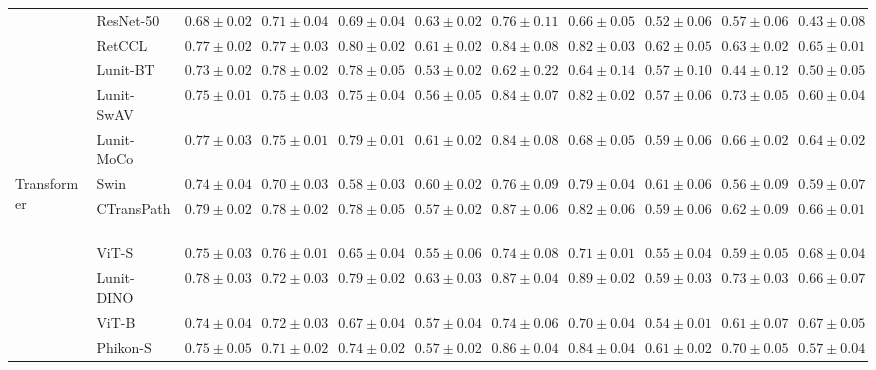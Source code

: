 \begin{tabular}{ll|cccc|c|cccc}
 & ResNet-50~\cite{he2015deep} & $0.68 \pm 0.02$ & $0.71 \pm 0.04$ & $0.69 \pm 0.04$ & $0.63 \pm 0.02$ & $0.76 \pm 0.11$ & $0.66 \pm 0.05$ & $0.52 \pm 0.06$ & $0.57 \pm 0.06$ & $0.43 \pm 0.08$ \\
 & RetCCL~\cite{wang2023retccl} & $0.77 \pm 0.02$ & $0.77 \pm 0.03$ & $0.80 \pm 0.02$ & $0.61 \pm 0.02$ & $0.84 \pm 0.08$ & $0.82 \pm 0.03$ & $\mathbf{0.62 \pm 0.05}$ & $0.63 \pm 0.02$ & $0.65 \pm 0.01$ \\
 & Lunit-BT~\cite{kang2023benchmarking} & $0.73 \pm 0.02$ & $0.78 \pm 0.02$ & $0.78 \pm 0.05$ & $0.53 \pm 0.02$ & $0.62 \pm 0.22$ & $0.64 \pm 0.14$ & $0.57 \pm 0.10$ & $0.44 \pm 0.12$ & $0.50 \pm 0.05$ \\
 & Lunit-SwAV~\cite{kang2023benchmarking} & $0.75 \pm 0.01$ & $0.75 \pm 0.03$ & $0.75 \pm 0.04$ & $0.56 \pm 0.05$ & $0.84 \pm 0.07$ & $0.82 \pm 0.02$ & $0.57 \pm 0.06$ & $0.73 \pm 0.05$ & $0.60 \pm 0.04$ \\
 & Lunit-MoCo~\cite{kang2023benchmarking} & $0.77 \pm 0.03$ & $0.75 \pm 0.01$ & $0.79 \pm 0.01$ & $0.61 \pm 0.02$ & $0.84 \pm 0.08$ & $0.68 \pm 0.05$ & $0.59 \pm 0.06$ & $0.66 \pm 0.02$ & $0.64 \pm 0.02$ \\
\cline{1-11}
\multirow[t]{14}{*}{Transformer} & Swin~\cite{liu2021swin} & $0.74 \pm 0.04$ & $0.70 \pm 0.03$ & $0.58 \pm 0.03$ & $0.60 \pm 0.02$ & $0.76 \pm 0.09$ & $0.79 \pm 0.04$ & $0.61 \pm 0.06$ & $0.56 \pm 0.09$ & $0.59 \pm 0.07$ \\
 & CTransPath~\cite{wang2022transformer} & $0.79 \pm 0.02$ & $\mathbf{0.78 \pm 0.02}$ & $0.78 \pm 0.05$ & $0.57 \pm 0.02$ & $0.87 \pm 0.06$ & $0.82 \pm 0.06$ & $0.59 \pm 0.06$ & $0.62 \pm 0.09$ & $0.66 \pm 0.01$ \\
 & ViT-S~\cite{kolesnikov2021image} & $0.75 \pm 0.03$ & $0.76 \pm 0.01$ & $0.65 \pm 0.04$ & $0.55 \pm 0.06$ & $0.74 \pm 0.08$ & $0.71 \pm 0.01$ & $0.55 \pm 0.04$ & $0.59 \pm 0.05$ & $\mathbf{0.68 \pm 0.04}$ \\
 & Lunit-DINO~\cite{kang2023benchmarking} & $0.78 \pm 0.03$ & $0.72 \pm 0.03$ & $0.79 \pm 0.02$ & $\mathbf{0.63 \pm 0.03}$ & $0.87 \pm 0.04$ & $\mathbf{0.89 \pm 0.02}$ & $0.59 \pm 0.03$ & $\mathbf{0.73 \pm 0.03}$ & $0.66 \pm 0.07$ \\
 & ViT-B~\cite{kolesnikov2021image} & $0.74 \pm 0.04$ & $0.72 \pm 0.03$ & $0.67 \pm 0.04$ & $0.57 \pm 0.04$ & $0.74 \pm 0.06$ & $0.70 \pm 0.04$ & $0.54 \pm 0.01$ & $0.61 \pm 0.07$ & $0.67 \pm 0.05$ \\
 & Phikon-S~\cite{filiot2023scaling} & $0.75 \pm 0.05$ & $0.71 \pm 0.02$ & $0.74 \pm 0.02$ & $0.57 \pm 0.02$ & $0.86 \pm 0.04$ & $0.84 \pm 0.04$ & $0.61 \pm 0.02$ & $0.70 \pm 0.05$ & $0.57 \pm 0.04$ \\

\end{tabular}
